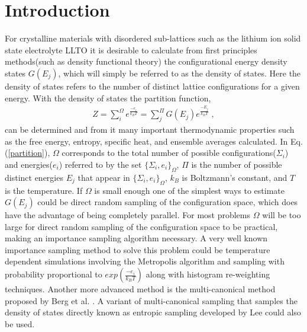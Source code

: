 \documentclass[aps,pre,reprint,superscriptaddress,showkeys]{revtex4-2}
\begin{document}
\section{Introduction}
For crystalline  materials  with disordered sub-lattices such as the lithium ion solid state electrolyte LLTO it is desirable to calculate from first principles methods(such as density functional theory\cite{kohn:1965}) the configurational energy density states $G(E_j)$, which will simply be referred to as the density of states. Here the  density of states refers to the number of distinct lattice configurations for a given energy. With the  density of states the partition function,
\begin{equation}
\begin{split}
Z = \sum_{i}^{\Omega}e^{\frac{-e_i}{k_B T} }= \sum_{j}^{\Pi}G(E_j)e^{\frac{-E_j}{k_BT}} \;,
\end{split}
\label{partition}
\end{equation}
can be  determined and from it many important thermodynamic properties such as the free energy, entropy, specific heat, and ensemble averages calculated. In Eq. (\ref{partition}), $\Omega$ corresponds to the total number of possible  configurations($\Sigma_i$) and energies($e_i$) referred to by the set $\{\Sigma_i,e_i\}_\Omega$, $\Pi$ is the number of possible distinct energies $E_j$ that appear in $\{\Sigma_i,e_i\}_\Omega$, $k_B$ is Boltzmann's constant, and $T$ is the temperature. If $\Omega$ is small enough one of the simplest ways to estimate $G(E_j)$ could be direct random sampling of the configuration space\cite{partition}, which does have the advantage of being completely parallel. For most problems $\Omega$ will be too large for direct random sampling of the configuration space to be practical, making an importance sampling algorithm necessary. A very well known importance sampling method to solve this problem could be temperature dependent simulations involving the Metropolis algorithm and sampling with probability proportional  to $exp(\frac{-e_i}{k_B T})$ 
along with histogram re-weighting techniques\cite{metropolis_equation_1953,histogram_reweighting, landau_MC_simulations}. Another more advanced method is the multi-canonical method proposed by Berg et al. \cite{Multi_Canonical,multi_canonical_two}. A variant of multi-canonical sampling that samples the density of states directly known as entropic sampling developed by Lee \cite{Entropic_Sampling} could also be used. 
\end{document}
